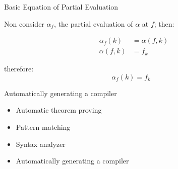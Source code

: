 \documentclass[aspectratio=169,dvipsnames]{beamer}
\begin{document}
\begin{frame}{Basic Equation of Partial Evaluation}

Non consider $\alpha_f$, the partial evaluation of $\alpha$ at $f$; then:

\begin{eqnarray*}
            &\alpha_f(k) &= \alpha(f,k)\\
            &\alpha(f,k) &= f_k
\end{eqnarray*}

therefore:
\begin{equation}
       \alpha_f(k) =f_k 
\end{equation}
\end{frame}

\begin{frame}{Automatically generating a compiler}

    \begin{itemize}
        \item Automatic theorem proving
        \item Pattern matching
        \item Syntax analyzer
        \item Automatically generating a compiler
    \end{itemize}
    
\end{frame}
\end{document}
